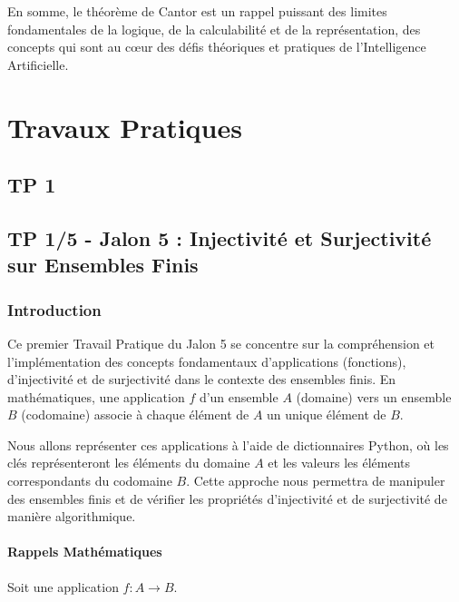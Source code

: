 \documentclass[12pt,a4paper]{report}
\begin{document}
En somme, le théorème de Cantor est un rappel puissant des limites
fondamentales de la logique, de la calculabilité et de la
représentation, des concepts qui sont au cœur des défis théoriques et
pratiques de l'Intelligence Artificielle.
\newpage
\chapter{Travaux Pratiques}
\section{TP 1}
\section{TP 1/5 - Jalon 5 : Injectivité et Surjectivité sur Ensembles
Finis}\label{tp-15---jalon-5-injectivituxe9-et-surjectivituxe9-sur-ensembles-finis}

\subsection{Introduction}\label{introduction}

Ce premier Travail Pratique du Jalon 5 se concentre sur la compréhension
et l'implémentation des concepts fondamentaux d'applications
(fonctions), d'injectivité et de surjectivité dans le contexte des
ensembles finis. En mathématiques, une application \(f\) d'un ensemble
\(A\) (domaine) vers un ensemble \(B\) (codomaine) associe à chaque
élément de \(A\) un unique élément de \(B\).

Nous allons représenter ces applications à l'aide de dictionnaires
Python, où les clés représenteront les éléments du domaine \(A\) et les
valeurs les éléments correspondants du codomaine \(B\). Cette approche
nous permettra de manipuler des ensembles finis et de vérifier les
propriétés d'injectivité et de surjectivité de manière algorithmique.

\subsubsection{Rappels Mathématiques}\label{rappels-mathuxe9matiques}

Soit une application \(f: A \to B\).
\end{document}
